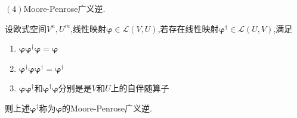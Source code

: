 $(4)$Moore-Penrose广义逆.
\begin{formal}
    \begin{definition}\label{def:Moore-Penrose广义逆的定义}
        设欧式空间$V^n,U^m$,线性映射$\bm{\varphi}\in\mathcal{L}\left(V,U\right)$,若存在线性映射$\bm{\varphi}^{\dagger}\in\mathcal{L}\left(U,V\right)$,满足\begin{enumerate}[label=\textup{(\arabic*)}]
            \item $\bm{\varphi}\bm{\varphi}^{\dagger}\bm{\varphi}=\bm{\varphi}$
            \item $\bm{\varphi}^{\dagger}\bm{\varphi}\bm{\varphi}^{\dagger}=\bm{\varphi}^{\dagger}$
            \item $\bm{\varphi}\bm{\varphi}^{\dagger}$和$\bm{\varphi}^{\dagger}\bm{\varphi}$分别是是$V$和$U$上的自伴随算子
        \end{enumerate}则上述$\bm{\varphi}^{\dagger}$称为$\bm{\varphi}$的\textup{Moore-Penrose}广义逆.
    \end{definition}
\end{formal}
